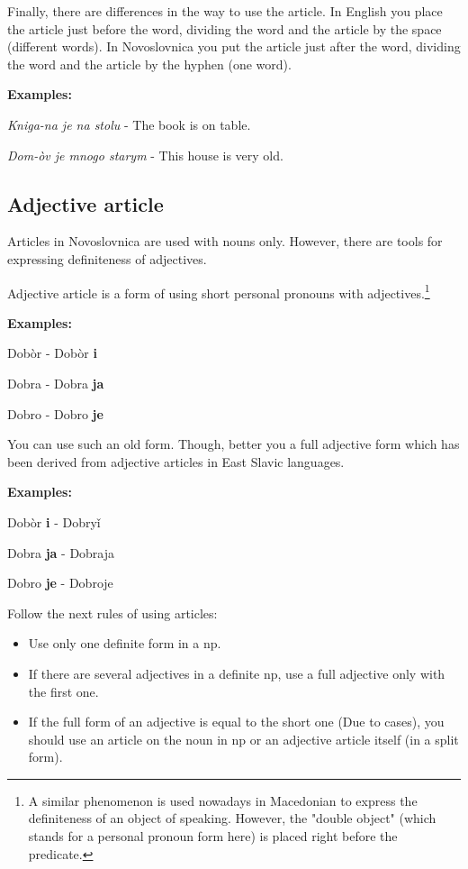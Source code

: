 Finally, there are differences in the way to use the article. In English you place the article just before the word, dividing the word and the article by the space (different words). In Novoslovnica you put the article just after the word, dividing the word and the article by the hyphen (one word).

\textbf{Examples:} 

\textit{Kniga-na je na stolu} - The book is on table.

\textit{Dom-òv je mnogo starym} - This house is very old.

\subsection{Adjective article}

Articles in Novoslovnica are used with nouns only. However, there are tools for expressing definiteness of adjectives.

Adjective article is a form of using short personal pronouns with adjectives.\footnote{A similar phenomenon is used nowadays in Macedonian to express the definiteness of an object of speaking. However, the "double object" (which stands for a personal pronoun form here) is placed right before the predicate.}

\textbf{Examples:}

Dobòr - Dobòr \textbf{i} 

Dobra - Dobra \textbf{ja} 

Dobro - Dobro \textbf{je} 

You can use such an old form. Though, better you a full adjective form which has been derived from adjective articles in East Slavic languages.

\textbf{Examples:}

Dobòr \textbf{i} - Dobryǐ

Dobra \textbf{ja} - Dobraja

Dobro \textbf{je} - Dobroje

Follow the next rules of using articles:

\begin{itemize}
	\item Use only one definite form in a \gls{np}.
	\item If there are several adjectives in a definite \gls{np}, use a full adjective only with the first one.
	\item If the full form of an adjective is equal to the short one (Due to cases), you should use an article on the noun in \gls{np} or an adjective article itself (in a split form).
\end{itemize}
